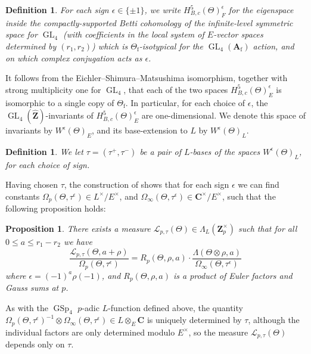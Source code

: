 \documentclass[cjm]{ipart}
\theoremstyle{plain}
\newtheorem{proposition}[theorem]{Proposition}
\newtheorem{definition}[theorem]{Definition}
\theoremstyle{remark}
\DeclareMathOperator{\GL}{GL}
\DeclareMathOperator{\GSp}{GSp}
\newcommand{\Af}{\AA_{\mathrm{f}}}
\newcommand{\CC}{\mathbf{C}}
\newcommand{\ZZ}{\mathbf{Z}}
\newcommand{\Zp}{\mathbf{Z}_p}
\newcommand{\cL}{\mathcal{L}}
\renewcommand{\AA}{\mathbf{A}}
\numberwithin{equation}{subsection}
\renewcommand{\le}{\leqslant}
\begin{document}
  \begin{definition}
   For each sign $\epsilon \in \{\pm 1\}$, we write $H^5_{B, c}(\Theta)_F^\epsilon$ for the eigenspace inside the compactly-supported Betti cohomology of the infinite-level symmetric space for $\GL_4$ (with coefficients in the local system of $E$-vector spaces determined by $(r_1, r_2)$) which is $\Theta_{\mathrm{f}}$-isotypical for the $\GL_4(\Af)$ action, and on which complex conjugation acts as $\epsilon$.
  \end{definition}

  It follows from the Eichler--Shimura--Matsushima isomorphism, together with strong multiplicity one for $\GL_4$, that each of the two spaces $H^5_{B, c}(\Theta)_E^\epsilon$ is isomorphic to a single copy of $\Theta_{\mathrm{f}}$. In particular, for each choice of $\epsilon$, the $\GL_4(\widehat{\ZZ})$-invariants of $H^5_{B, c}(\Theta)^\epsilon_E$ are one-dimensional. We denote this space of invariants by $W^\epsilon(\Theta)_E$, and its base-extension to $L$ by $W^\epsilon(\Theta)_L$.

  \begin{definition}
   We let $\tau = (\tau^+, \tau^-)$ be a pair of $L$-bases of the spaces $W^\epsilon(\Theta)_L$, for each choice of sign.
  \end{definition}

  Having chosen $\tau$, the construction of \cite{DJR20} shows that for each sign $\epsilon$ we can find constants $\Omega_p(\Theta, \tau^{\epsilon}) \in L^\times / E^\times$, and $\Omega_\infty(\Theta, \tau^{\epsilon}) \in \CC^\times / E^\times$, such that the following proposition holds:

  \begin{proposition}
   \label{def:GL4Lp}
   There exists a measure $\cL_{p, \tau}(\Theta) \in \Lambda_L(\Zp^\times)$ such that for all $0 \le a \le r_1-r_2$ we have
   \[ \frac{\cL_{p, \tau}(\Theta, a + \rho)}{\Omega_p(\Theta, \tau^\epsilon)} = R_p(\Theta, \rho, a) \cdot \frac{\Lambda(\Theta \otimes \rho, a)}{\Omega_\infty(\Theta, \tau^\epsilon)}\]
   where $\epsilon = (-1)^a \rho(-1)$, and $R_p(\Theta, \rho, a)$ is a product of Euler factors and Gauss sums at $p$.
  \end{proposition}

  \begin{remark}
   As with the $\GSp_4$ $p$-adic $L$-function defined above, the quantity $\Omega_p(\Theta, \tau^\epsilon)^{-1} \otimes \Omega_\infty(\Theta, \tau^\epsilon) \in L\otimes_E \CC$ is uniquely determined by $\tau$, although the individual factors are only determined modulo $E^\times$, so the measure $\cL_{p, \tau}(\Theta)$ depends only on $\tau$.
  \end{remark}
\end{document}
